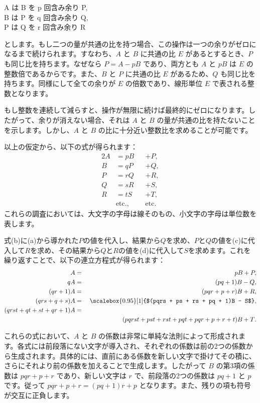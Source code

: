 \documentclass[a4paper,11pt,openany]{ltjsbook}
\newcommand{\etc}{\text{etc}}
\newcommand{\Squeeze}[2][0.95]{\scalebox{#1}[1]{$#2$}}
\begin{document}
\begin{center}
A は B を p 回含み余り P, \\
B は P を q 回含み余り Q, \\
P は Q を r 回含み余り R
\end{center}

とします。もし二つの量が共通の比を持つ場合、この操作は一つの余りがゼロになるまで続けられます。すなわち、\( A \) と \( B \) に共通の比 \( E \) があるとするとき、\( P \) も同じ比を持ちます。なぜなら \( P = A - pB \) であり、両方とも \( A \) と \( pB \) は \( E \) の整数倍であるからです。また、\( B \) と \( P \) に共通の比 \( E \) があるため、\( Q \) も同じ比を持ちます。同様にして全ての余りが \( E \) の倍数であり、線形単位 \( E \) で表される整数となります。

もし整数を連続して減らすと、操作が無限に続けば最終的にゼロになります。したがって、余りが消えない場合、それは \( A \) と \( B \) の量が共通の比を持たないことを示します。しかし、\( A \) と \( B \) の比に十分近い整数比を求めることが可能です。

以上の仮定から、以下の式が得られます：
\begin{alignat*}{2}
A &= pB &&+ P, \tag{(a)} \\
B &= qP &&+ Q, \tag{(b)} \\
P &= rQ &&+ R, \tag{(c)} \\
Q &= sR &&+ S, \tag{(d)} \\
R &= tS &&+ T, \tag{(e)} \\
&\etc., &&\etc.
\end{alignat*}
これらの調査においては、大文字の字母は線そのもの、小文字の字母は単位数を表します。

式(b)に(a)から導かれた$P$の値を代入し、結果から$Q$を求め、$P$と$Q$の値を(c)に代入して$R$を求め、その結果から$Q$と$R$の値を(d)に代入して$S$を求めます。これを繰り返すことで、以下の連立方程式が得られます：
\begin{alignat*}{2}
A &={}& pB + P, \\
qA &={}& (pq + 1)B - Q, \\
(qr + 1)A &={}& (pqr + p + r)B + R, \\
(qrs + q + s)A &={}& \Squeeze{(pqrs + ps + rs + pq + 1)B - S}, \\
(qrst + qt + st + qr + 1)A &={} \\
&& \llap{$(pqrst + pst + rst + pqt + pqr + p + r + t)B + T$.}
\end{alignat*}

これらの式において、$A$ と $B$ の係数は非常に単純な法則によって形成されます。各式には前段落にない文字が導入され、それぞれの係数は前の2つの係数から生成されます。具体的には、直前にある係数を新しい文字で掛けてその積に、さらにそれより前の係数を加えることで生成します。したがって $B$ の第3項の係数は $pqr + p + r$ であり、新しい文字は $r$ で、前段落の2つの係数は $pq + 1$ と $p$ です。従って $pqr + p + r = (pq + 1)r + p$ となります。また、残りの項も符号が交互に正負します。
\end{document}
